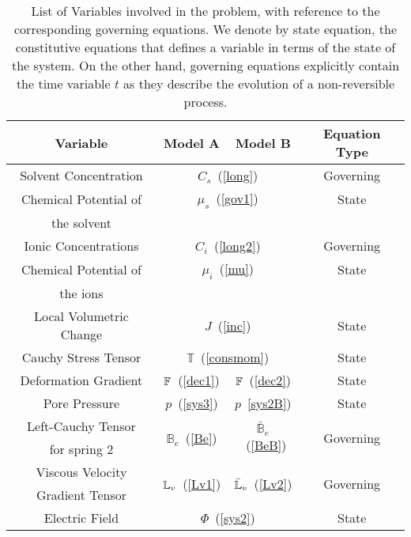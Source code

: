 \vspace{3mm}
\begin{table}
	\centering
	\begin{tabular}{c|c|c|c|}
		\hline\addlinespace[2pt]
		Variable &  \hspace{1pt} Model A \hspace{1pt} & \hspace{1pt} Model B\hspace{1pt} & \hspace{1pt}Equation Type\hspace{1pt}\\
		\hline
		\hline\addlinespace[2.5pt]
		Solvent Concentration &  \multicolumn{2}{c|}{$C_s$~(\ref{long})}& Governing \\[2.5pt]
		Chemical Potential of & \multicolumn{2}{c|}{ $\mu_s$~(\ref{gov1})}& State \\
		the solvent &\multicolumn{2}{c|}{}&\\[2pt]
		Ionic Concentrations & \multicolumn{2}{c|}{$C_i$~(\ref{long2})}& Governing \\[3pt]
		Chemical Potential of & \multicolumn{2}{c|}{$\mu_i$~(\ref{mu}) }& State \\
		the ions &\multicolumn{2}{c|}{ }&\\[2pt]
		\hline\addlinespace[2pt]
		Local Volumetric Change & \multicolumn{2}{c|}{$J$~(\ref{inc})}& State \\[2.5pt]
		Cauchy Stress Tensor & 	\multicolumn{2}{c|}{$\mathbb{T}$~(\ref{consmom})}& State \\[2.5pt]
		Deformation Gradient & $\mathbb{F}$~(\ref{dec1})& $\mathbb{F}$~(\ref{dec2})& State \\[2.5pt]
		Pore Pressure & $p$~(\ref{sys3}) & $p$~\ref{sys2B})& State \\[2.5pt]
		Left-Cauchy Tensor& \multirow{2}{*}{$\mathbb{B}_e$~(\ref{Be})} & \multirow{2}{*}{$\mathbb{\bar{B}}_e$~(\ref{BeB})}&\multirow{2}{*}{Governing}\\
		for spring 2&&&\\
		Viscous Velocity & \multirow{2}{*}{$\mathbb{L}_v$~(\ref{Lv1})}&  \multirow{2}{*}{$\bar{\mathbb{L}}_v$~(\ref{Lv2})}&\multirow{2}{*}{Governing }\\
		Gradient Tensor&&&\\
		\hline\addlinespace[2pt]
		Electric Field & \multicolumn{2}{c|}{$\Phi$~(\ref{sys2})}& State \\
		\hline 
		\hline
	\end{tabular}
	\vspace{3mm}
	\caption{List of Variables involved in the problem, with reference to the corresponding governing equations. We denote by state equation, the constitutive equations that defines a variable in terms of the state of the system. On the other hand, governing equations explicitly contain the time variable $t$ as they describe the evolution of a non-reversible process.}
	\label{summary}
\end{table}

